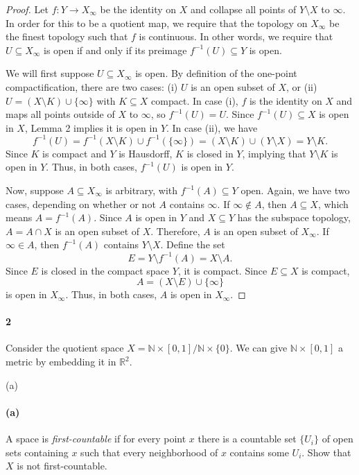 \documentclass[12pt]{article}
\newlength{\myparskip}
\newenvironment{fullbox}{\begin{lrbox}{\savefullbox}\begin{minipage}{\dimexpr\textwidth-2\fboxsep\relax}\setlength{\parskip}{\myparskip}}{\end{minipage}\end{lrbox}\framebox[\textwidth]{\usebox{\savefullbox}}}
\newenvironment{pbox}[1][]{\begin{fullbox}\ifx#1\empty\else\paragraph{#1}\fi}{\end{fullbox}}
\newcommand{\<}{\langle}
\renewcommand{\>}{\rangle}
\theoremstyle{definition}
\begin{document}
\begin{proof}
    Let $f : Y \to X_\infty$ be the identity on $X$ and collapse all points of $Y \setminus X$ to $\infty$. In order for this to be a quotient map, we require that the topology on $X_\infty$ be the finest topology such that $f$ is continuous. In other words, we require that $U \subseteq X_\infty$ is open if and only if its preimage $f^{-1}(U) \subseteq Y$ is open.

    We will first suppose $U \subseteq X_\infty$ is open. By definition of the one-point compactification, there are two cases: (i) $U$ is an open subset of $X$, or (ii) $U = (X \setminus K) \cup \{\infty\}$ with $K \subseteq X$ compact. In case (i), $f$ is the identity on $X$ and maps all points outside of $X$ to $\infty$, so $f^{-1}(U) = U$. Since $f^{-1}(U) \subseteq X$ is open in $X$, Lemma 2 implies it is open in $Y$. In case (ii), we have
    \[
        f^{-1}(U)
            = f^{-1}(X \setminus K) \cup f^{-1}(\{\infty\})
            = (X \setminus K) \cup (Y \setminus X)
            = Y \setminus K.
    \]
    Since $K$ is compact and $Y$ is Hausdorff, $K$ is closed in $Y$, implying that $Y \setminus K$ is open in $Y$. Thus, in both cases, $f^{-1}(U)$ is open in $Y$.

    Now, suppose $A \subseteq X_\infty$ is arbitrary, with $f^{-1}(A) \subseteq Y$ open. Again, we have two cases, depending on whether or not $A$ contains $\infty$. If $\infty \notin A$, then $A \subseteq X$, which means $A = f^{-1}(A)$. Since $A$ is open in $Y$ and $X \subseteq Y$ has the subspace topology, $A = A \cap X$ is an open subset of $X$. Therefore, $A$ is an open subset of $X_\infty$. If $\infty \in A$, then $f^{-1}(A)$ contains $Y \setminus X$. Define the set
    \[
        E
            = Y \setminus f^{-1}(A)
            = X \setminus A.
    \]
    Since $E$ is closed in the compact space $Y$, it is compact. Since $E \subseteq X$ is compact,
    \[
        A = (X \setminus E) \cup \{\infty\}
    \]
    is open in $X_\infty$. Thus, in both cases, $A$ is open in $X_\infty$.
\end{proof}




\newpage
\begin{pbox}[2]
    Consider the quotient space $X=\mathbb N \times [0,1]/\mathbb N \times \{0\}$.  We can give $\mathbb N \times [0,1]$ a metric by embedding it in $\mathbb R^2$.
\end{pbox}

\begin{pbox}[(a)]
    A space is \emph{first-countable} if for every point $x$ there is a countable set $\{U_i\}$ of open sets containing $x$ such that every neighborhood of $x$ contains some $U_i$.  Show that $X$ is not first-countable.
\end{pbox}
\end{document}
